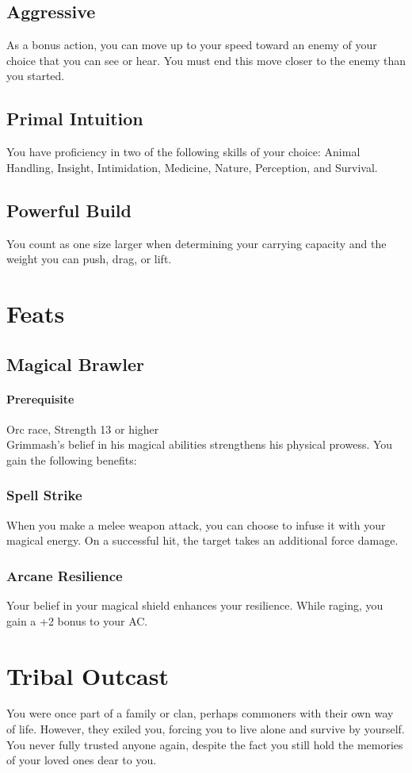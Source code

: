 \documentclass[letterpaper,openany,oneside,twocolumn]{book}
\begin{document}
\subsection*{Aggressive}
As a bonus action, you can move up to your speed toward an enemy of your choice that you can see or hear. You must end this move closer to the enemy than you started.
\subsection*{Primal Intuition}
You have proficiency in two of the following skills of your choice: Animal Handling, Insight, Intimidation, Medicine, Nature, Perception, and Survival.
\subsection*{Powerful Build}
You count as one size larger when determining your carrying capacity and the weight you can push, drag, or lift.

\section*{Feats}
\subsection*{Magical Brawler}
\paragraph*{Prerequisite} Orc race, Strength 13 or higher\\
Grimmash's belief in his magical abilities strengthens his physical prowess. You gain the following benefits:
\subsubsection*{Spell Strike}
When you make a melee weapon attack, you can choose to infuse it with your magical energy. On a successful hit, the target takes an additional  force damage.
\subsubsection*{Arcane Resilience}
Your belief in your magical shield enhances your resilience. While raging, you gain a +2 bonus to your AC.

\section*{Tribal Outcast}
You were once part of a family or clan, perhaps commoners with their own way of life. However, they exiled you, forcing you to live alone and survive by yourself. You never fully trusted anyone again, despite the fact you still hold the memories of your loved ones dear to you.
\end{document}
